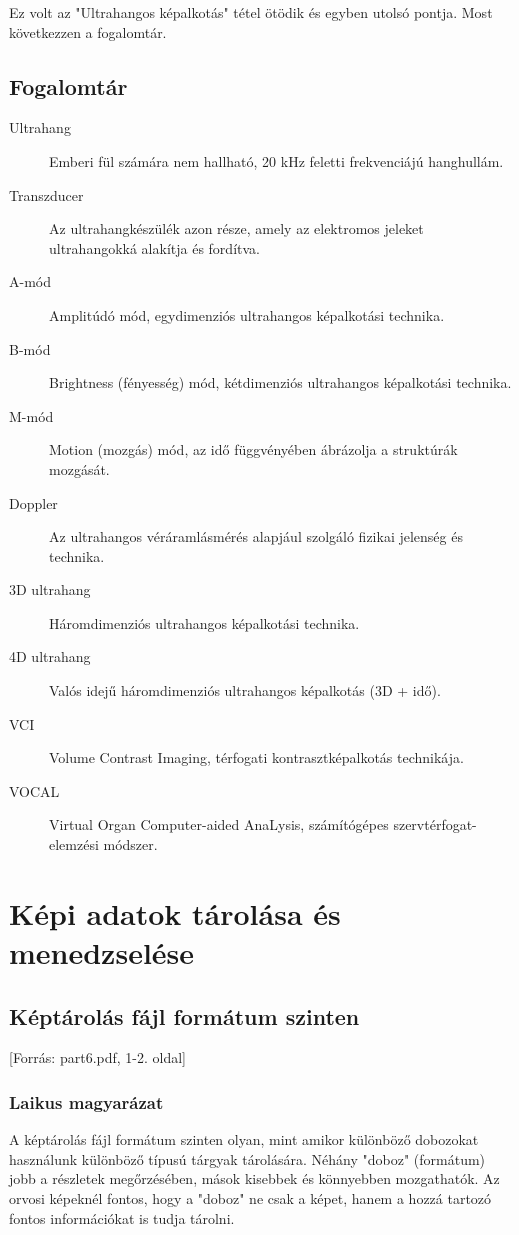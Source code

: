 \documentclass[a4paper,12pt]{article}
\begin{document}
Ez volt az "Ultrahangos képalkotás" tétel ötödik és egyben utolsó pontja. Most következzen a fogalomtár.

\subsection{Fogalomtár} 

\begin{description} \item[Ultrahang] Emberi fül számára nem hallható, 20 kHz feletti frekvenciájú hanghullám.

\item[Transzducer] Az ultrahangkészülék azon része, amely az elektromos jeleket ultrahangokká alakítja és fordítva. \item[A-mód] Amplitúdó mód, egydimenziós ultrahangos képalkotási technika. \item[B-mód] Brightness (fényesség) mód, kétdimenziós ultrahangos képalkotási technika. \item[M-mód] Motion (mozgás) mód, az idő függvényében ábrázolja a struktúrák mozgását. \item[Doppler] Az ultrahangos véráramlásmérés alapjául szolgáló fizikai jelenség és technika. \item[3D ultrahang] Háromdimenziós ultrahangos képalkotási technika. \item[4D ultrahang] Valós idejű háromdimenziós ultrahangos képalkotás (3D + idő). \item[VCI] Volume Contrast Imaging, térfogati kontrasztképalkotás technikája. \item[VOCAL] Virtual Organ Computer-aided AnaLysis, számítógépes szervtérfogat-elemzési módszer.
\end{description}

\newpage

\section{Képi adatok tárolása és menedzselése}

\subsection{Képtárolás fájl formátum szinten} [Forrás: part6.pdf, 1-2. oldal]

\subsubsection{Laikus magyarázat} A képtárolás fájl formátum szinten olyan, mint amikor különböző dobozokat használunk különböző típusú tárgyak tárolására. Néhány "doboz" (formátum) jobb a részletek megőrzésében, mások kisebbek és könnyebben mozgathatók. Az orvosi képeknél fontos, hogy a "doboz" ne csak a képet, hanem a hozzá tartozó fontos információkat is tudja tárolni.
\end{document}
